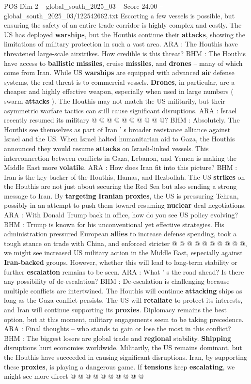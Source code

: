 \begin{textsample}{POS Dim 2 – global\_south\_2025\_03 – Score 24.00 – global\_south\_2025\_03/122542662.txt}
Escorting a few vessels is possible, but ensuring the safety of an entire trade corridor is highly complex and costly.
The US has deployed \textbf{warships}, but the Houthis continue their \textbf{attacks}, showing the limitations of military protection in such a vast area.
ARA : The Houthis have threatened large-scale airstrikes.
How credible is this threat?
BHM : The Houthis have access to \textbf{ballistic} \textbf{missiles}, cruise \textbf{missiles}, and \textbf{drones} -- many of which come from Iran.
While US \textbf{warships} are equipped with advanced \textbf{air} defense systems, the real threat is to commercial vessels. \textbf{Drones}, in particular, are a cheaper and highly effective weapon, especially when used in large numbers ( swarm \textbf{attacks} ).
The Houthis may not match the US militarily, but their asymmetric warfare tactics can still cause significant disruptions.
ARA : Israel recently resumed its military @ @ @ @ @ @ @ @ @ @?
BHM : Absolutely.
The Houthis see themselves as part of Iran ' s broader resistance alliance against Israel and the US.
When Israel halted humanitarian aid to Gaza, the Houthis announced they would resume \textbf{attacks} on Israeli-linked vessels.
This interconnection between conflicts in Gaza, Lebanon, and Yemen is making the Middle East more \textbf{volatile}.
ARA : How does Iran fit into this picture?
BHM : Iran is the key backer of the Houthis, Hamas, and Hezbollah.
The US \textbf{strikes} on the Houthis are not just about securing the Red Sea but also sending a strong message to Iran.
By \textbf{targeting} \textbf{Iranian} \textbf{proxies}, the US is pressuring Tehran, possibly in an attempt to push them toward resuming \textbf{nuclear} deal negotiations.
ARA : With Donald Trump back in office, how do you see US policy evolving?
BHM : Trump is known for his unconventional yet effective strategies.
His administration pressured European \textbf{allies} to increase defense spending, took a tough stance on trade with China, and enforced stricter @ @ @ @ @ @ @ @ @ @, we might see increased US military action in the Middle East, especially against \textbf{Iran-backed} groups.
However, whether this will lead to long-term stability or further \textbf{escalation} remains to be seen.
ARA : What ' s the road ahead?
Is there any possibility of de-escalation?
BHM : De-escalation is challenging because multiple conflicts are intertwined.
The Houthis will continue \textbf{attacking} ships as long as the Gaza conflict persists.
The US will \textbf{retaliate} to protect its interests, and Iran will continue supporting its \textbf{proxies}.
Diplomacy remains the best option, but at this moment, military engagements seem to be taking precedence.
ARA : Final thoughts -- who stands to gain or lose the most in this conflict?
BHM : The biggest losers are global trade and \textbf{regional} stability. \textbf{Shipping} disruptions hurt economies worldwide.
Militarily, the US remains dominant, but the Houthis have succeeded in causing significant disruptions.
Iran, by supporting these \textbf{proxies}, is playing a dangerous game.
If \textbf{tensions} keep \textbf{escalating}, we might see more direct @ @ @ @ @ @ @ @ @ @


\end{textsample}
